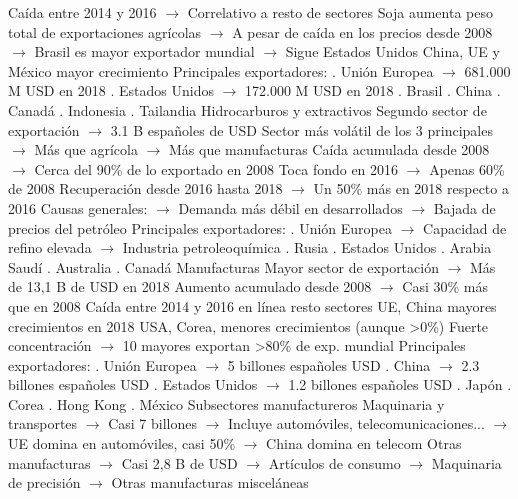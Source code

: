 \documentclass{nuevotema}
\begin{document}
\begin{esquemal}
				\4[] Caída entre 2014 y 2016
				\4[] $\to$ Correlativo a resto de sectores
				\4[] Soja aumenta peso total de exportaciones agrícolas
				\4[] $\to$ A pesar de caída en los precios desde 2008
				\4[] $\to$ Brasil es mayor exportador mundial
				\4[] $\to$ Sigue Estados Unidos
				\4[] China, UE y México mayor crecimiento
				\4[] Principales exportadores:
				. Unión Europea
				\4[] $\to$ 681.000 M USD en 2018
				. Estados Unidos
				\4[] $\to$ 172.000 M USD en 2018
				. Brasil
				. China
				. Canadá
				. Indonesia
				. Tailandia
				\4 Hidrocarburos y extractivos
				\4[] Segundo sector de exportación
				\4[] $\to$ 3.1 B españoles de USD
				\4[] Sector más volátil de los 3 principales
				\4[] $\to$ Más que agrícola
				\4[] $\to$ Más que manufacturas
				\4[] Caída acumulada desde 2008
				\4[] $\to$ Cerca del 90\% de lo exportado en 2008
				\4[] Toca fondo en 2016
				\4[] $\to$ Apenas 60\% de 2008
				\4[] Recuperación desde 2016 hasta 2018
				\4[] $\to$ Un 50\% más en 2018 respecto a 2016
				\4[] Causas generales:
				\4[] $\to$ Demanda más débil en desarrollados
				\4[] $\to$ Bajada de precios del petróleo
				\4[] Principales exportadores:
				. Unión Europea
				\4[] $\to$ Capacidad de refino elevada
				\4[] $\to$ Industria petroleoquímica
				. Rusia
				. Estados Unidos
				. Arabia Saudí
				. Australia
				. Canadá
				\4 Manufacturas
				\4[] Mayor sector de exportación
				\4[] $\to$ Más de 13,1 B de USD en 2018
				\4[] Aumento acumulado desde 2008
				\4[] $\to$ Casi 30\% más que en 2008
				\4[] Caída entre 2014 y 2016 en línea resto sectores
				\4[] UE, China mayores crecimientos en 2018
				\4[] USA, Corea, menores crecimientos (aunque >0\%)
				\4[] Fuerte concentración
				\4[] $\to$ 10 mayores exportan >80\% de exp. mundial
				\4[] Principales exportadores:
				. Unión Europea
				\4[] $\to$ 5 billones españoles USD
				. China
				\4[] $\to$ 2.3 billones españoles USD
				. Estados Unidos
				\4[] $\to$ 1.2 billones españoles USD
				. Japón
				. Corea
				. Hong Kong
				. México
				\4 Subsectores manufactureros
				\4[1.] Maquinaria y transportes
				\4[] $\to$ Casi 7 billones
				\4[] $\to$ Incluye automóviles, telecomunicaciones...
				\4[] $\to$ UE domina en automóviles, casi 50\%
				\4[] $\to$ China domina en telecom
				\4[2.] Otras manufacturas
				\4[] $\to$ Casi 2,8 B de USD
				\4[] $\to$ Artículos de consumo
				\4[] $\to$ Maquinaria de precisión
				\4[] $\to$ Otras manufacturas misceláneas

\end{esquemal}
\end{document}
